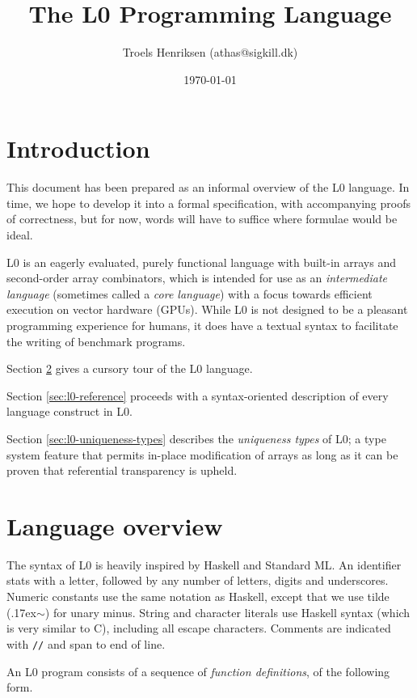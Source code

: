 \documentclass[oneside]{memoir}
\title{The L0 Programming Language}
\date{\today}
\author{Troels Henriksen (athas@sigkill.dk)}
\renewcommand\tilde[0]{{\raise.17ex\hbox{$\scriptstyle\sim$}}}
\begin{document}
\maketitle

\section{Introduction}

This document has been prepared as an informal overview of the L0
language.  In time, we hope to develop it into a formal specification,
with accompanying proofs of correctness, but for now, words will have
to suffice where formulae would be ideal.

L0 is an eagerly evaluated, purely functional language with built-in
arrays and second-order array combinators, which is intended for use
as an \emph{intermediate language} (sometimes called a \emph{core
  language}) with a focus towards efficient execution on vector
hardware (GPUs).  While L0 is not designed to be a pleasant
programming experience for humans, it does have a textual syntax to
facilitate the writing of benchmark programs.

Section \ref{sec:l0-overview} gives a cursory tour of the L0 language.

Section \ref{sec:l0-reference} proceeds with a syntax-oriented
description of every language construct in L0.

Section \ref{sec:l0-uniqueness-types} describes the \emph{uniqueness
  types} of L0; a type system feature that permits in-place
modification of arrays as long as it can be proven that referential
transparency is upheld.

\section{Language overview}
\label{sec:l0-overview}

The syntax of L0 is heavily inspired by Haskell and Standard ML.  An
identifier stats with a letter, followed by any number of letters,
digits and underscores.  Numeric constants use the same notation as
Haskell, except that we use tilde (\tilde{}) for unary minus.  String
and character literals use Haskell syntax (which is very
similar to C), including all escape characters.  Comments are
indicated with \texttt{//} and span to end of line.

An L0 program consists of a sequence of \emph{function definitions},
of the following form.
\end{document}
